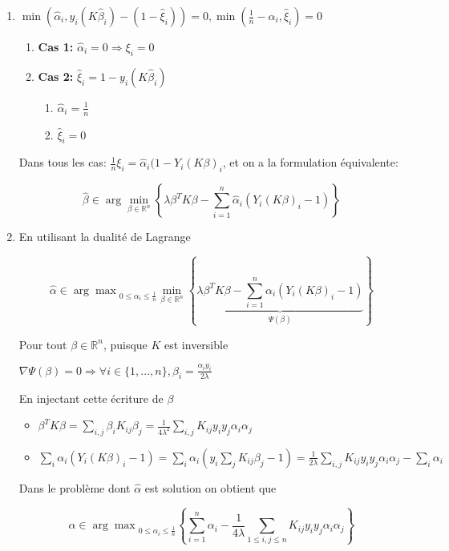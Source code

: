 \documentclass[10pt,a4paper,oneside]{article}
\newcommand{\argmin}{\arg\!\min}
\newcommand{\argmax}{\arg\!\max}
\begin{document}
\begin{enumerate}
\item
$\min (\hat{\alpha}_i, y_i (K \hat{\beta}_i) - (1 - \hat{\xi}_i)) = 0, \min(\frac{1}{n} - \hat{\alpha}_i, \hat{\xi}_i) = 0$

\begin{enumerate}
\item
\textbf{Cas 1:} $\hat{\alpha}_i = 0 \Rightarrow \xi_i = 0$

\item
\textbf{Cas 2:} $\hat{\xi}_i = 1 - y_i (K \hat{\beta}_i)$
\begin{enumerate}
\item
$\hat{\alpha}_i = \frac{1}{n}$
\item
$\hat{\xi}_i = 0$
\end{enumerate}
\end{enumerate}

Dans tous les cas: $\boxed{ \frac{1}{n} \xi_i = \hat{\alpha}_i (1 - Y_i (K \beta)_i }$, et on a la formulation équivalente:

\[ \hat{\beta} \in \argmin_{\beta \in \mathbb{R}^n} \left\{ \lambda \beta^T K \beta - \sum_{i = 1}^n \hat{\alpha}_i (Y_i (K\beta)_i - 1) \right\} \]

\item
En utilisant la dualité de Lagrange

\[ \hat{\alpha} \in {\argmax}_{0 \leq \alpha_i \leq \frac{1}{n}} \min_{\beta \in \mathbb{R}^n} \left\{ \underbrace{\lambda \beta^T K \beta - \sum_{i = 1}^n \alpha_i (Y_i (K \beta)_i - 1)}_{\Psi(\beta)} \right\} \]

Pour tout $\beta \in \mathbb{R}^n$, puisque $K$ est inversible

$\nabla \Psi(\beta) = 0 \Rightarrow \forall i \in \{ 1,\ldots,n \}, \beta_i = \frac{\alpha_i y_i}{2 \lambda}$

En injectant cette écriture de $\beta$

\begin{itemize}
\item
$\beta^T K \beta = \sum_{i,j} \beta_i K_{ij} \beta_j = \frac{1}{4\lambda^2} \sum_{i,j} K_{ij}y_iy_j\alpha_i\alpha_j$
\item
$\sum_i \alpha_i (Y_i (K \beta)_i - 1) = \sum_i \alpha_i (y_i \sum_j K_{ij} \beta_j - 1) = \frac{1}{2 \lambda} \sum_{i,j} K_{ij}y_iy_j\alpha_i\alpha_j - \sum_i \alpha_i$
\end{itemize}

Dans le problème dont $\hat{\alpha}$ est solution on obtient que

\[ \hat{\alpha} \in {\argmax}_{0 \leq \alpha_i \leq \frac{1}{n}} \left\{ \sum_{i = 1}^n \alpha_i - \frac{1}{4 \lambda} \sum_{1 \leq i,j \leq n} K_{ij} y_i y_j \alpha_i \alpha_j \right\} \]

\end{enumerate}
\end{document}
